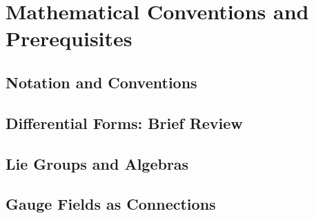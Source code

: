 %
%
%

\section{Mathematical Conventions and Prerequisites}


\subsection{Notation and Conventions}


\subsection{Differential Forms: Brief Review}


\subsection{Lie Groups and Algebras}


\subsection{Gauge Fields as Connections}


